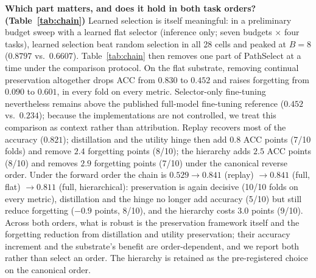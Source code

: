 \documentclass{article}
\begin{document}
\textbf{Which part matters, and does it hold in both task orders? (Table~\ref{tab:chain})}
Learned selection is itself meaningful: in a preliminary budget sweep with a learned flat selector (inference only; seven budgets $\times$ four tasks), learned selection beat random selection in all 28 cells and peaked at $B=8$ ($0.8797$ vs.\ $0.6607$). Table~\ref{tab:chain} then removes one part of PathSelect at a time under the comparison protocol. On the flat substrate, removing continual preservation altogether drops ACC from $0.830$ to $0.452$ and raises forgetting from $0.090$ to $0.601$, in every fold on every metric. Selector-only fine-tuning nevertheless remains above the published full-model fine-tuning reference ($0.452$ vs.\ $0.234$); because the implementations are not controlled, we treat this comparison as context rather than attribution. Replay recovers most of the accuracy ($0.821$); distillation and the utility hinge then add $0.8$ ACC points (7/10 folds) and remove $2.4$ forgetting points (8/10); the hierarchy adds $2.5$ ACC points (8/10) and removes $2.9$ forgetting points (7/10) under the canonical reverse order. Under the forward order the chain is $0.529\rightarrow0.841$ (replay) $\rightarrow0.841$ (full, flat) $\rightarrow0.811$ (full, hierarchical): preservation is again decisive (10/10 folds on every metric), distillation and the hinge no longer add accuracy (5/10) but still reduce forgetting ($-0.9$ points, 8/10), and the hierarchy costs $3.0$ points (9/10). Across both orders, what is robust is the preservation framework itself and the forgetting reduction from distillation and utility preservation; their accuracy increment and the substrate's benefit are order-dependent, and we report both rather than select an order. The hierarchy is retained as the pre-registered choice on the canonical order.
\end{document}
